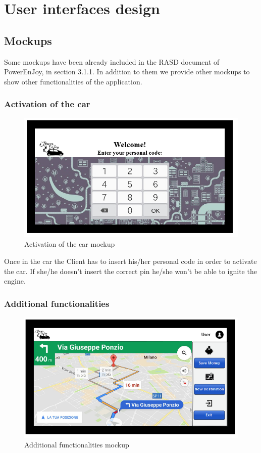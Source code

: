 \chapter{User interfaces design}
\section{Mockups}
Some mockups have been already included in the RASD document of PowerEnJoy, in section 3.1.1.
In addition to them we provide other mockups to show other functionalities of the application.

\subsection{Activation of the car}

\begin{figure}[H]
\centering
\includegraphics[scale=0.65, keepaspectratio]{../images/mockups/pin.png}
\caption{Activation of the car mockup}
\end{figure}

Once in the car the Client has to insert his/her personal code in order to activate the car.
If she/he doesn’t insert the correct pin he/she won’t be able to ignite the engine.
\subsection{Additional functionalities}

\begin{figure}[H]
\centering
\includegraphics[scale=0.65, keepaspectratio]{../images/mockups/ride.png}
\caption{Additional functionalities mockup}
\end{figure}

